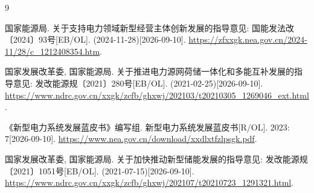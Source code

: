 \begin{thebibliography}{9}
\raggedright
{}
国家能源局.
关于支持电力领域新型经营主体创新发展的指导意见: 国能发法改〔2024〕93号[EB/OL].
(2024-11-28)[2026-09-10].
\url{https://zfxxgk.nea.gov.cn/2024-11/28/c_1212408354.htm}.

国家发展改革委, 国家能源局.
关于推进电力源网荷储一体化和多能互补发展的指导意见: 发改能源规〔2021〕280号[EB/OL].
(2021-02-25)[2026-09-10].
\url{https://www.ndrc.gov.cn/xxgk/zcfb/ghxwj/202103/t20210305_1269046_ext.html}.

《新型电力系统发展蓝皮书》编写组.
新型电力系统发展蓝皮书[R/OL].
2023: 7[2026-09-10].
\url{https://www.nea.gov.cn/download/xxdlxtfzlpsgk.pdf}.

国家发展改革委, 国家能源局.
关于加快推动新型储能发展的指导意见: 发改能源规〔2021〕1051号[EB/OL].
(2021-07-15)[2026-09-10].
\url{https://www.ndrc.gov.cn/xxgk/zcfb/ghxwj/202107/t20210723_1291321.html}.
\end{thebibliography}

